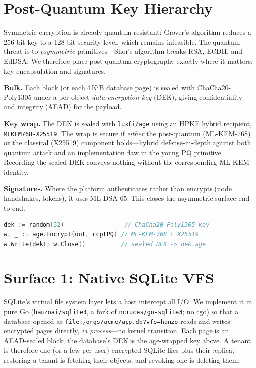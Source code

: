 \documentclass[11pt,twocolumn]{article}
\begin{document}
\section{Post-Quantum Key Hierarchy}
Symmetric encryption is already quantum-resistant: Grover's algorithm reduces a
256-bit key to a 128-bit security level, which remains infeasible. The quantum
threat is to \emph{asymmetric} primitives---Shor's algorithm breaks RSA, ECDH,
and EdDSA. We therefore place post-quantum cryptography exactly where it matters:
key encapsulation and signatures.

\textbf{Bulk.} Each block (or each 4\,KiB database page) is sealed with
ChaCha20-Poly1305 under a per-object \emph{data encryption key} (DEK), giving
confidentiality and integrity (AEAD) for the payload.

\textbf{Key wrap.} The DEK is sealed with \texttt{luxfi/age} using an HPKE
hybrid recipient, \texttt{MLKEM768-X25519}. The wrap is secure if \emph{either}
the post-quantum (ML-KEM-768) or the classical (X25519) component holds---hybrid
defense-in-depth against both quantum attack and an implementation flaw in the
young PQ primitive. Recording the sealed DEK conveys nothing without the
corresponding ML-KEM identity.

\textbf{Signatures.} Where the platform authenticates rather than encrypts
(node handshakes, tokens), it uses ML-DSA-65. This closes the asymmetric surface
end-to-end.

\begin{lstlisting}[language=Go,caption={Sealing a per-tenant DEK (HIP-0302).}]
dek := random(32)                 // ChaCha20-Poly1305 key
w, _ := age.Encrypt(out, rcptPQ) // ML-KEM-768 + X25519
w.Write(dek); w.Close()          // sealed DEK -> dek.age
\end{lstlisting}

\section{Surface 1: Native SQLite VFS}
SQLite's virtual file system layer lets a host intercept all I/O. We implement
it in pure Go (\texttt{hanzoai/sqlite3}, a fork of \texttt{ncruces/go-sqlite3};
no cgo) so that a database opened as
\texttt{file:/orgs/acme/app.db?vfs=hanzo} reads and writes encrypted pages
directly, \emph{in process}---no kernel transition. Each page is an AEAD-sealed
block; the database's DEK is the age-wrapped key above. A tenant is therefore one
(or a few per-user) encrypted SQLite files plus their replica; restoring a tenant
is fetching their objects, and revoking one is deleting them.
\end{document}
